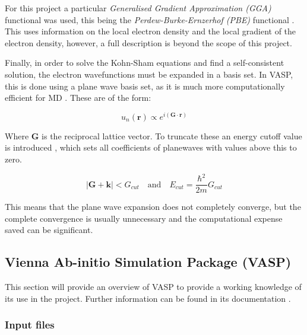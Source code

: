 \documentclass[a4paper,12pt]{article}
\begin{document}
For this project a particular \textit{Generalised Gradient Approximation (GGA)} functional was used, this being the \textit{Perdew-Burke-Ernzerhof (PBE)} functional \cite{AssessPBE, PBE}. This uses information on the local electron density and the local gradient of the electron density, however, a full description is beyond the scope of this project.
\bigskip

\noindent Finally, in order to solve the Kohn-Sham equations and find a self-consistent solution, the electron wavefunctions must be expanded in a basis set. In VASP, this is done using a plane wave basis set, as it is much more computationally efficient for MD \cite{PAWintro}. These are of the form:

\begin{equation}
u_n (\textbf{r}) \propto e^{i (\textbf{G} \cdot \textbf{r})}
\end{equation}

Where $\textbf{G}$ is the reciprocal lattice vector. To truncate these an energy cutoff value is introduced \cite{VASP}, which sets all coefficients of planewaves with values above this to zero.

\begin{equation}
|\textbf{G} + \textbf{k}| < G_{cut} \quad \mathrm{and} \quad E_{cut} = \frac{\hbar ^2}{2m}G_{cut}
\end{equation}
\bigskip

This means that the plane wave expansion does not completely converge, but the complete convergence is usually unnecessary and the computational expense saved can be significant.

\subsection{Vienna Ab-initio Simulation Package (VASP)}

This section will provide an overview of VASP to provide a working knowledge of its use in the project. Further information can be found in its documentation \cite{VASP}.

\subsubsection{Input files}
\end{document}
